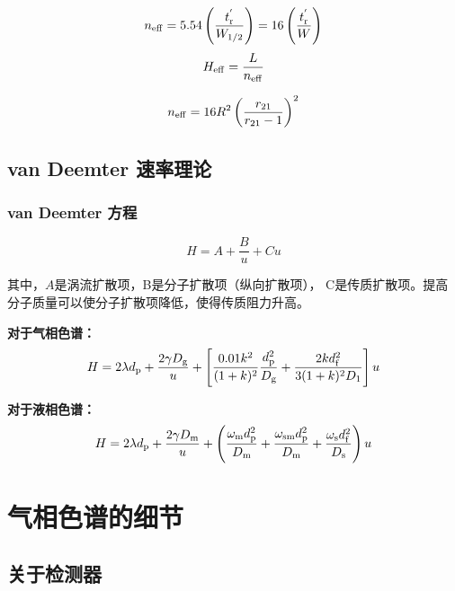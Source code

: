 \documentclass[UTF8,AutoFakeBold,b5paper]{ctexbook}
\begin{document}
\begin{equation}
	n_{\ce{eff}} = 5.54\left( \dfrac{t_{\ce{r}}^{'}}{W_{1/2}} \right) = 16\left( \dfrac{t_{\ce{r}}^{'}}{W} \right)
\end{equation}
\begin{equation}
	H_{\ce{eff}} = \dfrac{L}{n_{\ce{eff}}}
\end{equation}

\begin{equation}
	n_{\ce{eff}} = 16R^{2}\left( \dfrac{r_{21}}{r_{21}-1} \right)^{2}
\end{equation}
\subsection{van Deemter 速率理论}
\subsubsection{van Deemter 方程}
\begin{equation}
	H = A+\dfrac{B}{u} +Cu
\end{equation}

其中，\textcolor[rgb]{0.54,0.13,0.33}{$A$}是\textcolor[rgb]{0.54,0.13,0.33}{涡流扩散项}，\textcolor[rgb]{0.54,0.13,0.33}{B}是\textcolor[rgb]{0.54,0.13,0.33}{分子扩散项（纵向扩散项）}， \textcolor[rgb]{0.54,0.13,0.33}{C}是\textcolor[rgb]{0.54,0.13,0.33}{传质扩散项}。\textcolor[rgb]{0.56,0.28,0.16}{提高分子质量可以使分子扩散项降低，使得传质阻力升高}。


\textbf{对于气相色谱：}
\begin{equation}
	H = 2\lambda d_{\ce{p}} +\dfrac{2\gamma D_{\ce{g}}}{u} +\left[ \dfrac{0.01k^{2}}{(1+k)^{2}}\dfrac{d_{\ce{p}}^{2}}{D_{\ce{g}}}+\dfrac{2kd_{\ce{f}}^{2}}{3(1+k)^{2}D_{1}} \right]u
\end{equation}

\textbf{对于液相色谱：}
\begin{equation}
	H = 2\lambda d_{\ce{p}} +\dfrac{2\gamma D_{\ce{m}}}{u} +\left( \dfrac{\omega_{\ce{m}} d_{\ce{p}}^{2}}{D_{\ce{m}}}+\dfrac{\omega_{\ce{sm}} d_{\ce{p}}^{2}}{D_{\ce{m}}}+\dfrac{\omega_{\ce{s}} d_{\ce{f}}^{2}}{D_{\ce{s}}} \right)u
\end{equation}
\section{气相色谱的细节}
\subsection{关于检测器}
\end{document}
